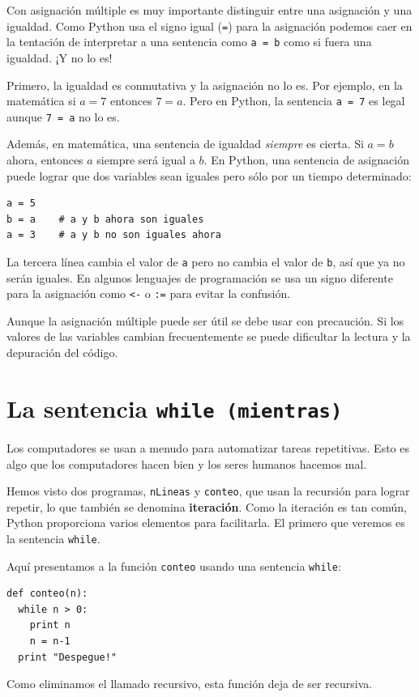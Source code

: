 Con asignación múltiple es muy importante distinguir entre una
asignación y una  igualdad. Como Python usa el signo igual (\texttt{=}) 
para la asignación podemos caer en la tentación de interpretar
a una sentencia  como \texttt{a = b} como si fuera una igualdad. ¡Y no lo es!

Primero, la igualdad es conmutativa y la asignación no lo es. Por 
ejemplo, en la matemática si $a = 7$ entonces $7 = a$.  Pero en Python, 
la sentencia \texttt{a = 7} es legal aunque \texttt{7 = a} no lo es.

Además, en matemática, una sentencia de igualdad \textit{siempre} es cierta.
Si  $a = b$ ahora, entonces $a$ siempre será igual a $b$.  En Python, 
una sentencia de asignación puede lograr que dos variables sean iguales
pero sólo por un tiempo determinado:

\beforeverb
\begin{verbatim}
a = 5
b = a    # a y b ahora son iguales
a = 3    # a y b no son iguales ahora
\end{verbatim}
\afterverb
%
La tercera línea cambia el valor de \texttt{a} pero no cambia
el valor de \texttt{b}, así que ya no serán iguales. En algunos
lenguajes de programación se usa un signo diferente para la 
asignación como \texttt{<-} o \texttt{:=} para evitar la confusión.

Aunque la asignación múltiple puede ser útil se debe usar
con precaución. Si los valores de las variables cambian 
frecuentemente se puede dificultar la lectura y la 
depuración del código.


\section{La sentencia \texttt{while (mientras)} }

Los computadores se usan a menudo para automatizar tareas repetitivas.
Esto es algo que los computadores hacen bien y los seres humanos
hacemos mal.

Hemos visto dos programas, \texttt{nLineas} y \texttt{conteo}, que usan
la recursión para lograr repetir, lo que también se denomina {\bf iteración}.
Como la iteración es tan común, Python proporciona varios elementos
para facilitarla. El primero que veremos es la sentencia  \texttt{while}.

Aquí presentamos a la función  \texttt{conteo} usando una sentencia \texttt{while}:

\beforeverb
\begin{verbatim}
def conteo(n):
  while n > 0:
    print n
    n = n-1
  print "Despegue!"
\end{verbatim}
\afterverb
%
Como eliminamos el llamado recursivo, esta función deja de ser
recursiva.

